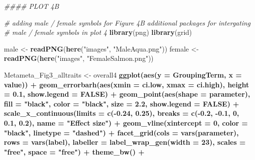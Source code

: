 \documentclass[]{article}
\newenvironment{Shaded}{\begin{snugshade}}{\end{snugshade}}
\newcommand{\CommentTok}[1]{\textcolor[rgb]{0.56,0.35,0.01}{\textit{#1}}}
\newcommand{\DataTypeTok}[1]{\textcolor[rgb]{0.13,0.29,0.53}{#1}}
\newcommand{\DecValTok}[1]{\textcolor[rgb]{0.00,0.00,0.81}{#1}}
\newcommand{\FloatTok}[1]{\textcolor[rgb]{0.00,0.00,0.81}{#1}}
\newcommand{\KeywordTok}[1]{\textcolor[rgb]{0.13,0.29,0.53}{\textbf{#1}}}
\newcommand{\NormalTok}[1]{#1}
\newcommand{\OperatorTok}[1]{\textcolor[rgb]{0.81,0.36,0.00}{\textbf{#1}}}
\newcommand{\OtherTok}[1]{\textcolor[rgb]{0.56,0.35,0.01}{#1}}
\newcommand{\StringTok}[1]{\textcolor[rgb]{0.31,0.60,0.02}{#1}}
\begin{document}
\begin{Shaded}
\begin{Highlighting}[]
{{{{\CommentTok{#### PLOT 4B}

\CommentTok{# adding male / female symbols for Figure 4B additional packages for intergating}
\CommentTok{# male / female symbols in plot 4}
\KeywordTok{library}\NormalTok{(png)}
\KeywordTok{library}\NormalTok{(grid)}

\NormalTok{male <-}\StringTok{ }\KeywordTok{readPNG}\NormalTok{(}\KeywordTok{here}\NormalTok{(}\StringTok{"images"}\NormalTok{, }\StringTok{"MaleAqua.png"}\NormalTok{))}
\NormalTok{female <-}\StringTok{ }\KeywordTok{readPNG}\NormalTok{(}\KeywordTok{here}\NormalTok{(}\StringTok{"images"}\NormalTok{, }\StringTok{"FemaleSalmon.png"}\NormalTok{))}


\NormalTok{Metameta_Fig3_alltraits <-}\StringTok{ }\NormalTok{overall4 }\OperatorTok{%>%}\StringTok{ }
\KeywordTok{ggplot}\NormalTok{(}\KeywordTok{aes}\NormalTok{(}\DataTypeTok{y =}\NormalTok{ GroupingTerm, }\DataTypeTok{x =}\NormalTok{ value)) }\OperatorTok{+}\StringTok{ }\KeywordTok{geom_errorbarh}\NormalTok{(}\KeywordTok{aes}\NormalTok{(}\DataTypeTok{xmin =}\NormalTok{ ci.low, }\DataTypeTok{xmax =}\NormalTok{ ci.high), }
    \DataTypeTok{height =} \FloatTok{0.1}\NormalTok{, }\DataTypeTok{show.legend =} \OtherTok{FALSE}\NormalTok{) }\OperatorTok{+}\StringTok{ }\KeywordTok{geom_point}\NormalTok{(}\KeywordTok{aes}\NormalTok{(}\DataTypeTok{shape =}\NormalTok{ parameter), }\DataTypeTok{fill =} \StringTok{"black"}\NormalTok{, }
    \DataTypeTok{color =} \StringTok{"black"}\NormalTok{, }\DataTypeTok{size =} \FloatTok{2.2}\NormalTok{, }\DataTypeTok{show.legend =} \OtherTok{FALSE}\NormalTok{) }\OperatorTok{+}\StringTok{ }\KeywordTok{scale_x_continuous}\NormalTok{(}\DataTypeTok{limits =} \KeywordTok{c}\NormalTok{(}\OperatorTok{-}\FloatTok{0.24}\NormalTok{, }
    \FloatTok{0.25}\NormalTok{), }\DataTypeTok{breaks =} \KeywordTok{c}\NormalTok{(}\OperatorTok{-}\FloatTok{0.2}\NormalTok{, }\FloatTok{-0.1}\NormalTok{, }\DecValTok{0}\NormalTok{, }\FloatTok{0.1}\NormalTok{, }\FloatTok{0.2}\NormalTok{), }\DataTypeTok{name =} \StringTok{"Effect size"}\NormalTok{) }\OperatorTok{+}\StringTok{ }\KeywordTok{geom_vline}\NormalTok{(}\DataTypeTok{xintercept =} \DecValTok{0}\NormalTok{, }
    \DataTypeTok{color =} \StringTok{"black"}\NormalTok{, }\DataTypeTok{linetype =} \StringTok{"dashed"}\NormalTok{) }\OperatorTok{+}\StringTok{ }\KeywordTok{facet_grid}\NormalTok{(}\DataTypeTok{cols =} \KeywordTok{vars}\NormalTok{(parameter), }\DataTypeTok{rows =} \KeywordTok{vars}\NormalTok{(label), }
    \DataTypeTok{labeller =} \KeywordTok{label_wrap_gen}\NormalTok{(}\DataTypeTok{width =} \DecValTok{23}\NormalTok{), }\DataTypeTok{scales =} \StringTok{"free"}\NormalTok{, }\DataTypeTok{space =} \StringTok{"free"}\NormalTok{) }\OperatorTok{+}\StringTok{ }\KeywordTok{theme_bw}\NormalTok{() }\OperatorTok{+}\StringTok{ }
}}}}}
\end{Highlighting}
\end{Shaded}
\end{document}

